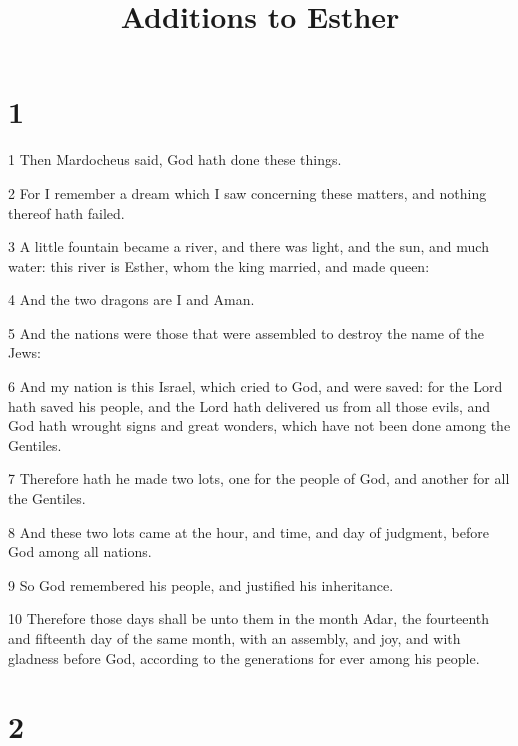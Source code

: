 

\title{Additions to Esther}

\chapter{1}

\par 1 Then Mardocheus said, God hath done these things.
\par 2 For I remember a dream which I saw concerning these matters, and nothing thereof hath failed.
\par 3 A little fountain became a river, and there was light, and the sun, and much water: this river is Esther, whom the king married, and made queen:
\par 4 And the two dragons are I and Aman.
\par 5 And the nations were those that were assembled to destroy the name of the Jews:
\par 6 And my nation is this Israel, which cried to God, and were saved: for the Lord hath saved his people, and the Lord hath delivered us from all those evils, and God hath wrought signs and great wonders, which have not been done among the Gentiles.
\par 7 Therefore hath he made two lots, one for the people of God, and another for all the Gentiles.
\par 8 And these two lots came at the hour, and time, and day of judgment, before God among all nations.
\par 9 So God remembered his people, and justified his inheritance.
\par 10 Therefore those days shall be unto them in the month Adar, the fourteenth and fifteenth day of the same month, with an assembly, and joy, and with gladness before God, according to the generations for ever among his people.

\chapter{2}

